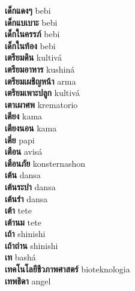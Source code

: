\textbf{ เด็กแดงๆ  } bebi \\
\textbf{ เด็กแบเบาะ  } bebi \\
\textbf{ เด็กในครรภ์  } bebi \\
\textbf{ เด็กในท้อง  } bebi \\
\textbf{ เตรียมดิน  } kultivá \\
\textbf{ เตรียมอาหาร  } kushiná \\
\textbf{ เตรียมเผชิญหน้า  } arma \\
\textbf{ เตรียมเพาะปลูก  } kultivá \\
\textbf{ เตาเผาศพ  } krematorio \\
\textbf{ เตียง  } kama \\
\textbf{ เตียงนอน  } kama \\
\textbf{ เตี่ย  } papi \\
\textbf{ เตือน  } avisá \\
\textbf{ เตือนภัย  } konsternashon \\
\textbf{ เต้น  } dansa \\
\textbf{ เต้นระบำ  } dansa \\
\textbf{ เต้นรำ  } dansa \\
\textbf{ เต้า  } tete \\
\textbf{ เต้านม  } tete \\
\textbf{ เถ้า  } shinishi \\
\textbf{ เถ้าถ่าน  } shinishi \\
\textbf{ เท  } bashá \\
\textbf{ เทคโนโลยีชีวภาพศาสตร์  } bioteknologia \\
\textbf{ เทพธิดา  } angel \\
